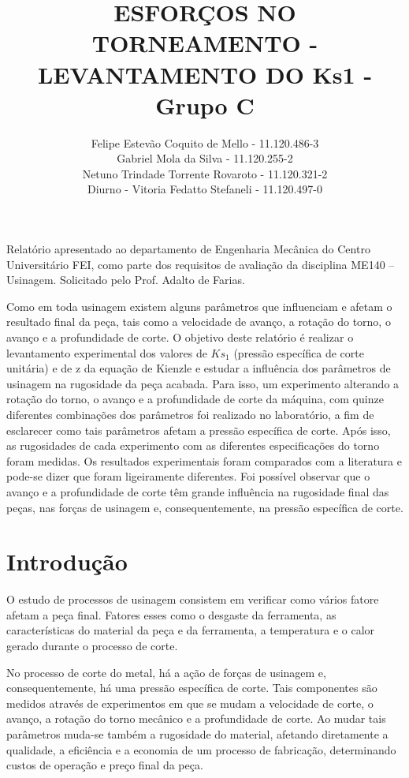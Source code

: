 \documentclass[deposito, acronym, symbols]{fei}
\title{ESFORÇOS NO TORNEAMENTO - LEVANTAMENTO DO Ks1 - Grupo C}
\author{ Felipe Estevão Coquito de Mello - 11.120.486-3 \\ Gabriel Mola da Silva - 11.120.255-2 \\ Netuno Trindade Torrente Rovaroto - 11.120.321-2 \\ Diurno - Vitoria Fedatto Stefaneli - 11.120.497-0}
\begin{document}
\maketitle

\begin{folhaderosto}
	Relatório apresentado ao departamento de Engenharia Mecânica do Centro Universitário FEI, como parte dos requisitos de avaliação da disciplina ME140 – Usinagem. Solicitado pelo Prof. Adalto de Farias.
\end{folhaderosto}

\begin{resumo}

Como em toda usinagem existem alguns parâmetros que influenciam e afetam o resultado final da peça, tais como a velocidade de avanço, a rotação do torno, o avanço e a profundidade de corte. O objetivo deste relatório é realizar o levantamento experimental dos valores de $Ks_1$ (pressão específica de corte unitária) e de z da equação de Kienzle e estudar a influência dos parâmetros de usinagem na rugosidade da peça acabada. Para isso, um experimento alterando a rotação do torno, o avanço e a profundidade de corte da máquina, com quinze diferentes combinações dos parâmetros foi realizado no laboratório, a fim de esclarecer como tais parâmetros afetam a pressão específica de corte. Após isso, as rugosidades de cada experimento com as diferentes especificações do torno foram medidas. Os resultados experimentais foram comparados com a literatura e pode-se dizer que foram ligeiramente diferentes. Foi possível observar que o avanço e a profundidade de corte têm grande influência na rugosidade final das peças, nas forças de usinagem e, consequentemente, na pressão específica de corte. 


\end{resumo}

\tableofcontents
\listoffigures
\listoftables

\chapter{Introdução}
O estudo de processos de usinagem consistem em verificar como vários fatore afetam a peça final. Fatores esses como o desgaste da ferramenta, as características do material da peça e da ferramenta, a temperatura e o calor gerado durante o processo de corte. 

No processo de corte do metal, há a ação de forças de usinagem e, consequentemente, há uma pressão específica de corte. Tais componentes são medidos através de experimentos em que se mudam a velocidade de corte, o avanço, a rotação do torno mecânico e a profundidade de corte. Ao mudar tais parâmetros muda-se também a rugosidade do material, afetando diretamente a qualidade, a eficiência e a economia de um processo de fabricação, determinando custos de operação e preço final da peça. 
\end{document}
